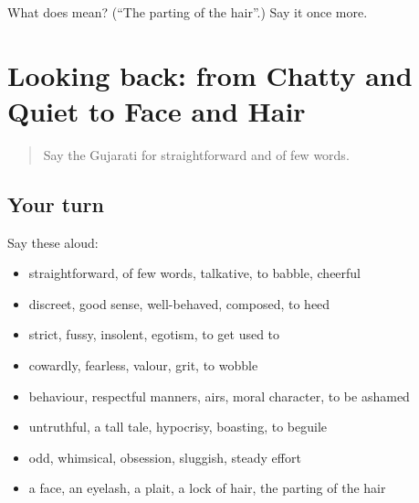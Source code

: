 \begin{tcolorbox}[breakable,colback=teal!4,colframe=teal!35!black,title={Before you move on}]
What does  mean? (\textquotedblleft{}The parting of the hair\textquotedblright{}.) Say it once more.
\end{tcolorbox}
\section[(dialogue)]{Looking back: from Chatty and Quiet to Face and Hair}

\label{lesson:GU-R470-review-463-470}



\begin{quote}
Say the Gujarati for straightforward and of few words.
\end{quote}

\subsection*{Your turn}
Say these aloud:

\begin{itemize}
\raggedright
  \item straightforward, of few words, talkative, to babble, cheerful
  \item discreet, good sense, well-behaved, composed, to heed
  \item strict, fussy, insolent, egotism, to get used to
  \item cowardly, fearless, valour, grit, to wobble
  \item behaviour, respectful manners, airs, moral character, to be ashamed
  \item untruthful, a tall tale, hypocrisy, boasting, to beguile
  \item odd, whimsical, obsession, sluggish, steady effort
  \item a face, an eyelash, a plait, a lock of hair, the parting of the hair
\end{itemize}

